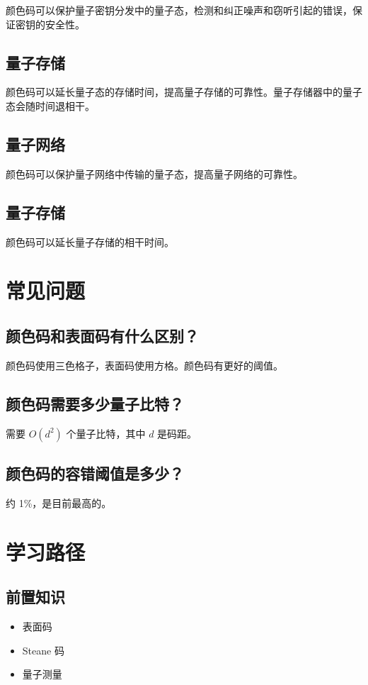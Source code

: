 \documentclass[12pt,a4paper]{article}
\begin{document}
颜色码可以保护量子密钥分发中的量子态，检测和纠正噪声和窃听引起的错误，保证密钥的安全性。

\subsection{量子存储}

颜色码可以延长量子态的存储时间，提高量子存储的可靠性。量子存储器中的量子态会随时间退相干。

\subsection{量子网络}

颜色码可以保护量子网络中传输的量子态，提高量子网络的可靠性。

\subsection{量子存储}

颜色码可以延长量子存储的相干时间。

\section{常见问题}

\subsection{颜色码和表面码有什么区别？}

颜色码使用三色格子，表面码使用方格。颜色码有更好的阈值。

\subsection{颜色码需要多少量子比特？}

需要 $O(d^2)$ 个量子比特，其中 $d$ 是码距。

\subsection{颜色码的容错阈值是多少？}

约 1\%，是目前最高的。

\section{学习路径}

\subsection{前置知识}
\begin{itemize}
  \item 表面码
  \item Steane 码
  \item 量子测量
\end{itemize}
\end{document}
